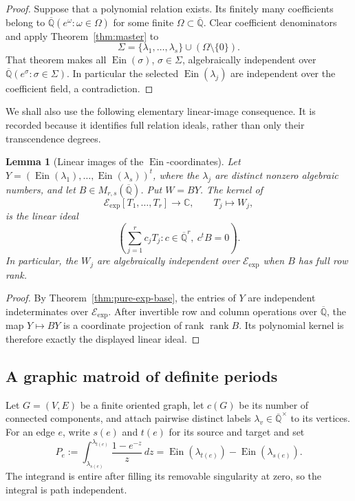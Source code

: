 \documentclass[11pt]{article}
\newtheorem{lemma}[theorem]{Lemma}
\theoremstyle{definition}
\theoremstyle{remark}
\newcommand{\Qbar}{\overline{\mathbb Q}}
\newcommand{\C}{\mathbb C}
\newcommand{\Ein}{\operatorname{Ein}}
\newcommand{\Eexp}{\mathcal E_{\mathrm{exp}}}
\begin{document}
\begin{proof}
Suppose that a polynomial relation exists.  Its finitely many coefficients
belong to
\(\Qbar(e^\omega:\omega\in\Omega)\) for some finite
\(\Omega\subset\Qbar\).  Clear coefficient denominators and apply
Theorem~\ref{thm:master} to
\[
 \Sigma=\{\lambda_1,\ldots,\lambda_s\}
        \cup(\Omega\setminus\{0\}).
\]
That theorem makes all \(\Ein(\sigma)\), \(\sigma\in\Sigma\),
algebraically independent over
\(\Qbar(e^\sigma:\sigma\in\Sigma)\).  In particular the selected
\(\Ein(\lambda_j)\) are independent over the coefficient field, a
contradiction.
\end{proof}

We shall also use the following elementary linear-image consequence.  It is
recorded because it identifies full relation ideals, rather than only their
transcendence degrees.

\begin{lemma}[Linear images of the \(\Ein\)-coordinates]
\label{lem:linear-image-ein}
Let \(Y=(\Ein(\lambda_1),\ldots,\Ein(\lambda_s))^t\), where the
\(\lambda_j\) are distinct nonzero algebraic numbers, and let
\(B\in M_{r,s}(\Qbar)\).  Put \(W=BY\).  The kernel of
\[
 \Eexp[T_1,\ldots,T_r]\longrightarrow\C,
 \qquad T_j\longmapsto W_j,
\]
is the linear ideal
\[
 \left(\sum_{j=1}^r c_jT_j:
       c\in\Qbar^r,\ c^tB=0\right).
\]
In particular, the \(W_j\) are algebraically independent over \(\Eexp\)
when \(B\) has full row rank.
\end{lemma}

\begin{proof}
By Theorem~\ref{thm:pure-exp-base}, the entries of \(Y\) are independent
indeterminates over \(\Eexp\).  After invertible row and column operations
over \(\Qbar\), the map \(Y\mapsto BY\) is a coordinate projection of rank
\(\operatorname{rank}B\).  Its polynomial kernel is therefore exactly the
displayed linear ideal.
\end{proof}

\subsection{A graphic matroid of definite periods}

Let \(G=(V,E)\) be a finite oriented graph, let \(c(G)\) be its number of
connected components, and attach pairwise distinct labels
\(\lambda_v\in\Qbar^\times\) to its vertices.  For an edge \(e\), write
\(s(e)\) and \(t(e)\) for its source and target and set
\begin{equation}\label{eq:graph-period}
 P_e:=\int_{\lambda_{s(e)}}^{\lambda_{t(e)}}
             \frac{1-e^{-z}}{z}\,dz
     =\Ein(\lambda_{t(e)})-\Ein(\lambda_{s(e)}).
\end{equation}
The integrand is entire after filling its removable singularity at zero, so
the integral is path independent.
\end{document}
